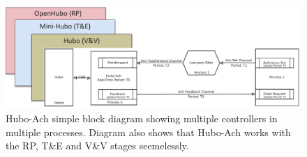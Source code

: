 


\begin{figure}[t]
  \centering
\includegraphics[width=1.0\textwidth]{./pix/hubo-ach-simple2.pdf}
  \caption{Hubo-Ach simple block diagram showing multiple controllers in multiple processes.  Diagram also shows that Hubo-Ach works with the RP, T\&E and V\&V stages seemelessly.}
  \label{fig:hubo-ach-simple}
\end{figure}











